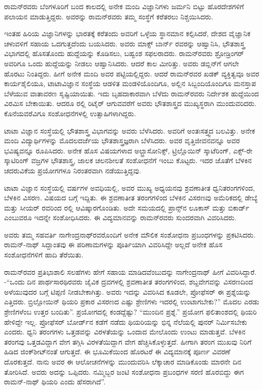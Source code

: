 ರಾಮನ್‍ರವರು ಬೆಂಗಳೂರಿಗೆ ಬಂದ ಕಾಲದಲ್ಲಿ ಅನೇಕ ಮಂದಿ ವಿಜ್ಞಾನಿಗಳು ಜರ್ಮನಿ ಬಿಟ್ಟು ಹೊರದೇಶಗಳಿಗೆ ಪಲಾಯನ ಮಾಡುತ್ತಿದ್ದರು. ಅವರನ್ನು ರಾಮನ್‍ರವರು ತಮ್ಮ ಸಂಸ್ಥೆಗೆ ಕರೆತರಲು ನಿಶ್ಚಯಿಸಿದರು.

ಇಂತಹ ಹಿರಿಯ ವಿಜ್ಞಾನಿಗಳನ್ನು ಭಾರತಕ್ಕೆ ಕರೆತಂದು ಅವರಿಗೆ ಒಳ್ಳೆಯ ಸ್ಥಾನಮಾನ ಕಲ್ಪಿಸಿದರೆ, ದೇಶದ ವೈಜ್ಞಾನಿಕ ಚಳುವಳಿಗೆ ಸಹಾಯ ಒದಗುತ್ತದೆಂದು ಬಯಸಿದರು. ಅವರು ಮಾಕ್ಸ್ ಬಾರ್ನ್ ರವರನ್ನು ಆಹ್ವಾನಿಸಿ, ಭೌತಶಾಸ್ತ್ರ ವಿಭಾಗದಲ್ಲಿ ಹೊಸತೊಂದು ಹುದ್ದೆಯನ್ನು ಕೊಡಿಸಲು, ಬಹ್ವಂಶ ಸಫಲರಾದರು. ರಾಮನ್‍ರವರು ಶ್ರೋಡ್ರಿಂಗರ್ ಅವರಿಗೂ ಒಂದು ಹುದ್ದೆಯನ್ನು ನೀಡಲು ಆಹ್ವಾನಿಸಿದರು. ಆದರೆ ಕಾಲ ಮೀರಿತ್ತು. ಅವರು ಡಬ್ಲಿನ್‍ಗೆ ಆಗಲೇ ಹೊರಟು ನಿಂತಿದ್ದರು. ಹೀಗೆ ಅನೇಕ ಮಂದಿ ಅವರ ಪಟ್ಟಿಯಲ್ಲಿದ್ದರು. ಆದರೆ ರಾಮನ್‍ರವರ ಖಡಕ್ ವ್ಯಕ್ತಿತ್ವವೂ ಅವರ ಕಾರ್ಯಶೈಲಿಯೂ, ಟಾಟಾವಿಜ್ಞಾನ ಸಂಸ್ಥೆಯ ಆಡಳಿತ ಮಂಡಳಿಯೊಂದಿಗೂ, ಅಲ್ಲಿನ ಸಿಬ್ಬಂದಿಯೊಂದಿಗೂ ಮನಸ್ತಾಪ ಬೆಳೆಯುವ ವಾತಾವರಣ ಸೃಷ್ಟಿಯಾಯಿತು. ಇದು ಬೃಹದಾಕಾರವಾಗಿ ಬೆಳೆದು ರಾಮನ್‍ರವರು ನಿರ್ದೇಶಕ ಹುದ್ದೆಯಿಂದ ವಿರಮಿಸ ಬೇಕಾಯಿತು. ಆದರೂ ರಲ್ಲಿ ರಿಟೈರ್ ಆಗುವವರೆಗೆ ಅವರು ಭೌತಶಾಸ್ತ್ರದ ಮುಖ್ಯಸ್ಥರಾಗಿ ಮುಂದುವರಿದರು. ಕೊನೆಯವರೆವಿಗೂ ಸಂಶೋಧನೆಗಳಲ್ಲಿ ಉತ್ಸಾಹಿಗಳಾಗಿದ್ದರು.

ಟಾಟಾ ವಿಜ್ಞಾನ ಸಂಸ್ಥೆಯಲ್ಲಿ ಭೌತಶಾಸ್ತ್ರ ವಿಭಾಗವನ್ನು ಅವರು ಬೆಳೆಸಿದರು. ಅವರಿಗೆ ಅಂತಃಸತ್ತ್ವದ ಬಲವಿತ್ತು. ಅನೇಕ ಮಂದಿ ವಿದ್ಯಾರ್ಥಿಗಳನ್ನು ಮೊದಲದರ್ಜೆಯ ಭೌತಶಾಸ್ತ್ರಜ್ಞರಾಗಿ ಬೆಳೆಸಿದರು. ಅವರ ವೃತ್ತಿಜೀವನವನ್ನೂ ಅವರ ಭವಿಷ್ಯವನ್ನೂ ರೂಪಿಸಿದರು. ಅನೇಕ ಹೊಸ ವಿಷಯಗಳಾದ ಅಲ್ಟ್ರಾಸೋನಿಕ್ಸ್, ಟ್ರಿಲ್ಲೊಯಿನ್ ಸ್ಕಾಟೆರಿಂಗ್, ಎಕ್ಸ್-ರೇ ಸ್ಕಾಟಿರಿಂಗ್ ವಜ್ರಗಳ ಭೌತಶಾಸ್ತ್ರ, ಜಾಲಕ ಚಲನಶೀಲತೆ ಸಂಶೋಧನೆಗೆ ಇಂಬು ಕೊಟ್ಟರು. ಇದರ ಜೊತೆಗೆ ಬೆಳಕಿನ ಚದರುವಿಕೆಯ ಪ್ರಯೋಗಗಳೂ ನಿರಂತರವಾಗಿ ನಡೆಯುತ್ತಿದ್ದವು.

ಟಾಟಾ ವಿಜ್ಞಾನ ಸಂಸ್ಥೆಯಲ್ಲಿ  ವರ್ಷಗಳ ಅವಧಿಯಲ್ಲಿ, ಅವರ ಮುಖ್ಯ ಅಧ್ಯಯನವು ಶ್ರವಣಾತೀತ ಧ್ವನಿತರಂಗಗಳಿಂದ, ಬೆಳಕಿನ ವಿಸರಣ. ವಿಷಯದ ಬಗ್ಗೆ ಇದ್ದಿತು. ಈ ಶ್ರವಣಾತೀತ ತರಂಗಗಳಿಂದ ಬೆಳಕಿನ ವಿಸರಣವು ಅಮೆರಿಕದಲ್ಲಿ ಡೇಬ್ಯೆ ಮತ್ತು ಸೀಯರ್ ರವರಿಂದ ರಲ್ಲಿ ಆವಿಷ್ಕಾರಗೊಂಡಿತು. ಅದೇ ಸಮಯದಲ್ಲಿ ಪ್ರಾನ್ಸ್‌ನ ಲೂಕಾಸ್ ಮತ್ತು ಬಿಕಾರ್ಡ್ ಎಂಬುವರೂ ಇದನ್ನೇ ಸಂಶೋಧಿಸಿದರು. ಈ ವಿದ್ಯಮಾನವನ್ನು ರಾಮನ್‍ರವರು ಸುಂದರವಾಗಿ ವಿವರಿಸಿದರು.

ಅವರು ತಮ್ಮ ಸಹವರ್ತಿ ನಾಗೇಂದ್ರನಾಥ್‍ರವರೊಂದಿಗೆ ಅನೇಕ ಮೌಲಿಕ ಸಂಶೋಧನಾ ಪ್ರಬಂಧಗಳನ್ನು ಪ್ರಕಟಿಸಿದರು. ರಾಮನ್-ನಾಥ್ ಸಿದ್ದಾಂತವು ಈ ಪರಿಣಾಮಗಳನ್ನು ಪೂರ್ತಿಯಾಗಿ ವಿವರಿಸಿದ್ದೇ ಅಲ್ಲದೆ ಅನೇಕ ಹೊಸ ಸಂಶೋಧನೆಗಳಿಗೆ ಹಾದಿ ತೆರೆಯಿತು.

ರಾಮನ್‍ರವರ ಪ್ರತಿಭಾಶಾಲಿ ಸಲಹೆಗಳು ಹೇಗೆ ಸಹಾಯ ಮಾಡಿದವೆಂಬುದನ್ನು ನಾಗೇಂದ್ರನಾಥ್ ಹೀಗೆ ವಿವರಿಸಿದ್ದಾರೆ. -“ಒಂದು ದಿನ ಪಾರ್ಥಸಾರಥಿರವರು ಜೈವಿಕ ದ್ರವಗಳಲ್ಲಿ ಶ್ರವಣಾತೀತ ತರಂಗಗಳಿಂದ, ಶಬ್ದವೇಗವನ್ನು ವಿಸರಣದಿಂದ ಅಳೆಯುವುದರ ಬಗ್ಗೆ ಟಿಪ್ಪಣಿ ನೀಡಬೇಕಾಗಿತ್ತು. ಅವರು ಇದನ್ನು ವಿವರಿಸಿದ ಕೂಡಲೇ, ಪ್ರೋಫೆಸರ್ ಈ ಪ್ರಶ್ನೆಯನ್ನು ಎತ್ತಿದರು. ಬ್ರಿಲ್ಲೋಯಿನ್ ಥಿಯರಿ ಪ್ರಕಾರ ವಿಸರಣದ ಎಷ್ಟು ಶ್ರೇಣಿಗಳು ಇದರಲ್ಲಿ ಉಂಟಾಗಬೇಕು?” ಮೊದಲ ಎರಡು ಶ್ರೇಣಿಗಳೆಂಬ ಉತ್ತರ ಬಂದಿತು”. ಪ್ರಯೋಗದಲ್ಲಿ ಕಂಡದ್ದೆಷ್ಟು? “ಮುಂದಿನ ಪ್ರಶ್ನೆ.” ಪ್ರಯೋಗ ಫಲಿತಾಂಶದಲ್ಲಿ ಥಿಯರಿ ಹೇಳಿದ್ದೇ ಇಲ್ಲ. ಪ್ರೋಫೆಸರ್ ಬೋರ್ಡ್‌ನ ಕಡೆಗೆ ನಡೆದು ಥಿಯರಿಯನ್ನು ಭಿನ್ನ ನೆಲೆಯಲ್ಲಿ ಪುನರ್ ನಿರ್ಮಿಸಬೇಕು ಎಂದರು. ಧ್ವನಿ ತರಂಗಗಳು ಒತ್ತಡವನ್ನು ವಿರಳತೆಯನ್ನು ಒಂದಾದ ಮೇಲೊಂದು ಉಂಟು ಮಾಡುತ್ತವೆ. ಬೆಳಕಿನ ತರಂಗವು ಒತ್ತಡವಿದ್ದಾಗ ವೇಗ ತಗ್ಗಿಸಿ ವಿರಳತೆಯಿದ್ದಾಗ ವೇಗ ಹೆಚ್ಚಿಸಿಕೊಳ್ಳುತ್ತದೆ. ಹೀಗಾಗಿ ತರಂಗ ಮುಖವು ನಿರಿಗೆ ಹಿಡಿದ ಜಿಂಕ್‍ಶೀಟ್‍ನಂತೆ ಆಗುತ್ತದೆ. ಈ ಭೂಮಿಕೆಯಿಂದ ಹೊರಟರೆ ಈ ವಿದ್ಯಮಾನಕ್ಕೆ ಪೂರ್ಣ ವಿವರಣೆ ದೊರಕುತ್ತದೆ. ನಾನು ಅವರ ಈ ಆಲೋಚನೆಗಳನ್ನು ಮುಂದುವರಿಸಿ ಲೆಕ್ಕಾಚಾರ ಮಾಡಿಕೊಂಡು ಮಾರನೇ ದಿನ ತೋರಿಸಿದೆ. ಅವರು ಅದನ್ನು ಒಪ್ಪಿದರು. ನಮ್ಮಿಬ್ಬರ ಜಂಟಿ ಸಂಶೋಧನಾ ಪ್ರಬಂಧಗಳ ಸರಣಿ ಹೊರಬಿದ್ದು ಈಗ ರಾಮನ್-ನಾಥ್ ಥಿಯರಿ ಎಂದು ಹೆಸರಾಗಿದೆ”.

